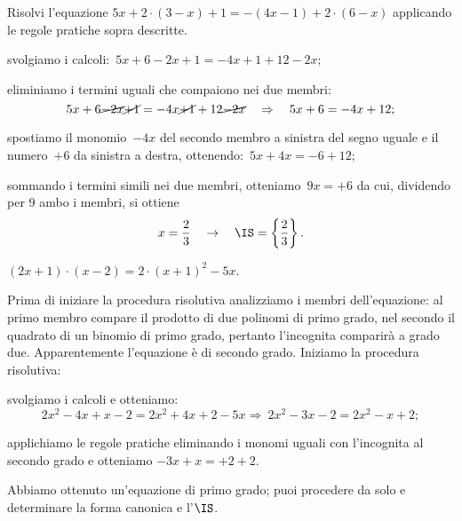 \begin{exrig}
\begin{esempio}
 Risolvi l'equazione $5x+2\cdot (3-x)+1=-(4x-1)+2\cdot (6-x)$ applicando le regole pratiche sopra descritte.
\begin{enumeratea}
 \item svolgiamo i calcoli:~$5x+6-2x+1=-4x+1+12-2x$;
 \item eliminiamo i termini uguali che compaiono nei due membri:
 \[5x+6 \cancel{-2x}\cancel{+1}=-4x \cancel{+1}+12\cancel{-2x}\quad\Rightarrow\quad 5x+6=-4x+12;\]
 \item spostiamo il monomio~$-4x$ del secondo membro a sinistra del segno uguale e il numero~$+6$
da sinistra a destra, ottenendo:~$5x+4x=-6+12$;
\item sommando i termini simili nei due membri, otteniamo~$9x=+6$ da cui, dividendo per 9
 ambo i membri, si ottiene
 \[x=\dfrac{2}{3}\quad\to\quad \IS =\left\{\dfrac{2}{3}\right\}.\]
 \end{enumeratea}
\end{esempio}

 \begin{esempio}

$(2x+1)\cdot (x-2)=2\cdot (x+1)^{2}-5x$.

Prima di iniziare la procedura risolutiva analizziamo i membri
dell'equazione: al primo membro compare il prodotto
di due polinomi di primo grado, nel secondo il quadrato di un binomio
di primo grado, pertanto l'incognita comparirà a grado due. Apparentemente
l'equazione è di secondo grado. Iniziamo la procedura
risolutiva:
\begin{enumeratea}
\item svolgiamo i calcoli e otteniamo:
\[2x^{2}-4x+x-2=2x^{2}+4x+2-5x\Rightarrow~2x^{2}-3x-2=2x^{2}-x+2;\]
\item applichiamo le regole pratiche eliminando i monomi
uguali con l'incognita al secondo grado e otteniamo
$-3x+x=+2+2$.
\end{enumeratea}

Abbiamo ottenuto un'equazione di primo grado; puoi
procedere da solo e determinare la forma canonica e l'$\IS$.

 \end{esempio}
\end{exrig}

